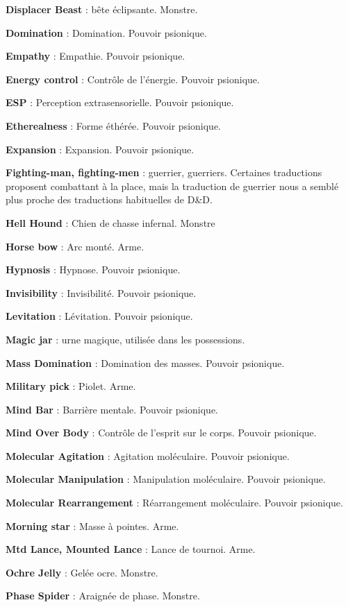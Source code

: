 \documentclass[11pt]{article}
\begin{document}
{{\textbf{Displacer Beast} : bête éclipsante. Monstre.

\textbf{Domination} : Domination. Pouvoir psionique.

\textbf{Empathy} : Empathie. Pouvoir psionique.

\textbf{Energy control} : Contrôle de l'énergie. Pouvoir psionique.

\textbf{ESP} : Perception extrasensorielle. Pouvoir psionique.

\textbf{Etherealness} : Forme éthérée. Pouvoir psionique.

\textbf{Expansion} : Expansion. Pouvoir psionique.

\textbf{Fighting-man, fighting-men} : guerrier, guerriers. Certaines traductions proposent \og combattant \fg{} à la place, mais la traduction de guerrier nous a semblé plus proche des traductions habituelles de D\&D.

\textbf{Hell Hound} : Chien de chasse infernal. Monstre

\textbf{Horse bow} : Arc monté. Arme.

\textbf{Hypnosis} : Hypnose. Pouvoir psionique.

\textbf{Invisibility} : Invisibilité. Pouvoir psionique.

\textbf{Levitation} : Lévitation. Pouvoir psionique.

\textbf{Magic jar} : urne magique, utilisée dans les possessions.

\textbf{Mass Domination} : Domination des masses. Pouvoir psionique.

\textbf{Military pick} : Piolet. Arme.

\textbf{Mind Bar} : Barrière mentale. Pouvoir psionique.

\textbf{Mind Over Body} : Contrôle de l'esprit sur le corps. Pouvoir psionique.

\textbf{Molecular Agitation} : Agitation moléculaire. Pouvoir psionique.

\textbf{Molecular Manipulation} : Manipulation moléculaire. Pouvoir psionique.

\textbf{Molecular Rearrangement} : Réarrangement moléculaire. Pouvoir psionique.

\textbf{Morning star} : Masse à pointes. Arme.

\textbf{Mtd Lance, Mounted Lance} : Lance de tournoi. Arme.

\textbf{Ochre Jelly} : Gelée ocre. Monstre.

\textbf{Phase Spider} : Araignée de phase. Monstre.

}}
\end{document}

